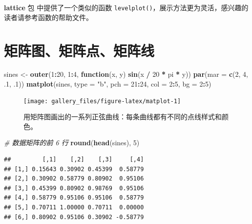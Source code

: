 \documentclass[
  b5paper,
  UTF8,twoside]{book}
\newenvironment{Shaded}{\begin{snugshade}}{\end{snugshade}}
\newcommand{\AttributeTok}[1]{\textcolor[rgb]{0.13,0.29,0.53}{#1}}
\newcommand{\CommentTok}[1]{\textcolor[rgb]{0.56,0.35,0.01}{\textit{#1}}}
\newcommand{\ControlFlowTok}[1]{\textcolor[rgb]{0.13,0.29,0.53}{\textbf{#1}}}
\newcommand{\DecValTok}[1]{\textcolor[rgb]{0.00,0.00,0.81}{#1}}
\newcommand{\FunctionTok}[1]{\textcolor[rgb]{0.13,0.29,0.53}{\textbf{#1}}}
\newcommand{\NormalTok}[1]{#1}
\newcommand{\OtherTok}[1]{\textcolor[rgb]{0.56,0.35,0.01}{#1}}
\newcommand{\SpecialCharTok}[1]{\textcolor[rgb]{0.81,0.36,0.00}{\textbf{#1}}}
\newcommand{\StringTok}[1]{\textcolor[rgb]{0.31,0.60,0.02}{#1}}
\begin{document}
\textbf{lattice} 包 \citep{Sarkar08} 中提供了一个类似的函数 \texttt{levelplot()}，展示方法更为灵活，感兴趣的读者请参考函数的帮助文件。

\section{矩阵图、矩阵点、矩阵线}\label{sec:matplot}





\begin{Shaded}
\begin{Highlighting}[]
\NormalTok{sines }\OtherTok{\textless{}{-}} \FunctionTok{outer}\NormalTok{(}\DecValTok{1}\SpecialCharTok{:}\DecValTok{20}\NormalTok{, }\DecValTok{1}\SpecialCharTok{:}\DecValTok{4}\NormalTok{, }\ControlFlowTok{function}\NormalTok{(x, y) }\FunctionTok{sin}\NormalTok{(x }\SpecialCharTok{/} \DecValTok{20} \SpecialCharTok{*}\NormalTok{ pi }\SpecialCharTok{*}\NormalTok{ y))}
\FunctionTok{par}\NormalTok{(}\AttributeTok{mar =} \FunctionTok{c}\NormalTok{(}\DecValTok{2}\NormalTok{, }\DecValTok{4}\NormalTok{, .}\DecValTok{1}\NormalTok{, .}\DecValTok{1}\NormalTok{))}
\FunctionTok{matplot}\NormalTok{(sines, }\AttributeTok{type =} \StringTok{"b"}\NormalTok{, }\AttributeTok{pch =} \DecValTok{21}\SpecialCharTok{:}\DecValTok{24}\NormalTok{, }\AttributeTok{col =} \DecValTok{2}\SpecialCharTok{:}\DecValTok{5}\NormalTok{, }\AttributeTok{bg =} \DecValTok{2}\SpecialCharTok{:}\DecValTok{5}\NormalTok{)}
\end{Highlighting}
\end{Shaded}

\begin{figure}

{\centering \texttt{[image: gallery\_files/figure-latex/matplot-1]} 

}

\caption[用矩阵图画出的一系列正弦曲线]{用矩阵图画出的一系列正弦曲线：每条曲线都有不同的点线样式和颜色。}\label{fig:matplot}
\end{figure}

\begin{Shaded}
\begin{Highlighting}[]
\CommentTok{\# 数据矩阵的前 6 行}
\FunctionTok{round}\NormalTok{(}\FunctionTok{head}\NormalTok{(sines), }\DecValTok{5}\NormalTok{)}
\end{Highlighting}
\end{Shaded}

\begin{verbatim}
##         [,1]    [,2]    [,3]     [,4]
## [1,] 0.15643 0.30902 0.45399  0.58779
## [2,] 0.30902 0.58779 0.80902  0.95106
## [3,] 0.45399 0.80902 0.98769  0.95106
## [4,] 0.58779 0.95106 0.95106  0.58779
## [5,] 0.70711 1.00000 0.70711  0.00000
## [6,] 0.80902 0.95106 0.30902 -0.58779
\end{verbatim}
\end{document}
